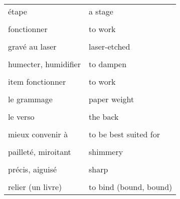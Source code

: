 \documentclass[
  10pt,
]{article}
\begin{document}
\begin{longtable}{ll}
étape & a stage\\

\cellcolor{gray!6}{expédier} & \cellcolor{gray!6}{to ship out}\\

fonctionner & to work\\

\cellcolor{gray!6}{glisser} & \cellcolor{gray!6}{to glide}\\

gravé au laser & laser-etched\\

\cellcolor{gray!6}{hello} & \cellcolor{gray!6}{bonjour}\\

humecter, humidifier & to dampen\\

\cellcolor{gray!6}{imprimer} & \cellcolor{gray!6}{to print}\\

item fonctionner & to work\\

\cellcolor{gray!6}{le dos (d'un livre)} & \cellcolor{gray!6}{the spine}\\

le grammage & paper weight\\

\cellcolor{gray!6}{le recto} & \cellcolor{gray!6}{the front}\\

le verso & the back\\

\cellcolor{gray!6}{livrer} & \cellcolor{gray!6}{to deliver}\\

mieux convenir à & to be best suited for\\

\cellcolor{gray!6}{mince, fin} & \cellcolor{gray!6}{thin}\\

pailleté, miroitant & shimmery\\

\cellcolor{gray!6}{piqûre à cheval} & \cellcolor{gray!6}{saddle-stitched}\\

précis, aiguisé & sharp\\

\cellcolor{gray!6}{recto-verso} & \cellcolor{gray!6}{both sides}\\

relier (un livre) & to bind (bound, bound)\\


\end{longtable}
\end{document}
